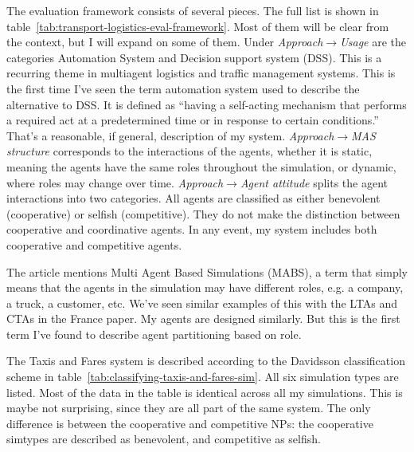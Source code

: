 \documentclass[11pt,letterpaper,onecolumn,twoside,openright,draft]{report}
\begin{document}
The evaluation framework consists of several pieces.
The full list is shown in table~\ref{tab:transport-logistics-eval-framework}.
Most of them will be clear from the context, but I will expand on some of them.
Under \emph{Approach}$\to$\emph{Usage} are the categories Automation System and Decision support system (DSS).
This is a recurring theme in multiagent logistics and traffic management systems.
This is the first time I've seen the term automation system used to describe the alternative to DSS.
It is defined as ``having a self-acting mechanism that performs a required act at a predetermined time or in response to certain conditions.''
That's a reasonable, if general, description of my system.
\emph{Approach}$\to$\emph{MAS structure} corresponds to the interactions of the agents, whether it is static, meaning the agents have the same roles throughout the simulation, or dynamic, where roles may change over time.
\emph{Approach}$\to$\emph{Agent attitude} splits the agent interactions into two categories.
All agents are classified as either benevolent (cooperative) or selfish (competitive).
They do not make the distinction between cooperative and coordinative agents.
In any event, my system includes both cooperative and competitive agents.

The article mentions Multi Agent Based Simulations (MABS), a term that simply means that the agents in the simulation may have different roles, e.g. a company, a truck, a customer, etc.
We've seen similar examples of this with the LTAs and CTAs in the France paper.
My agents are designed similarly.
But this is the first term I've found to describe agent partitioning based on role.

The Taxis and Fares system is described according to the Davidsson classification scheme in table~\ref{tab:classifying-taxis-and-fares-sim}.
All six simulation types are listed.
Most of the data in the table is identical across all my simulations.
This is maybe not surprising, since they are all part of the same system.
The only difference is between the cooperative and competitive NPs: the cooperative simtypes are described as benevolent, and competitive as selfish.
\end{document}
